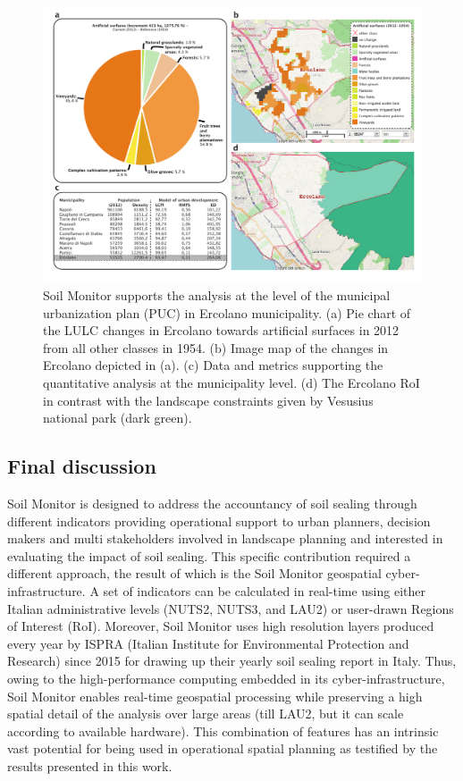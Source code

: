 \documentclass[APA,LATO1COL,doublespace]{WileyNJD-v2}
\begin{document}
\begin{figure}[t] %
    \centerline{\includegraphics[width=520pt]{07_caso_comunale}}
    \caption{ Soil Monitor supports the analysis at the level of the municipal urbanization plan (PUC) in Ercolano municipality.
              (a) Pie chart of the LULC changes in Ercolano towards artificial surfaces in 2012 from all other classes in 1954.
              (b) Image map of the changes in Ercolano depicted in (a).
              (c) Data and metrics supporting the quantitative analysis at the municipality level.
              (d) The Ercolano RoI in contrast with the landscape constraints given by Vesusius national park (dark green). }
    \label{fig:caseCOM_Ercolano}
\end{figure}

\subsection{Final discussion}
\label{sec:finaldiscussion}
Soil Monitor is designed to address the accountancy of soil sealing through different indicators providing operational support to urban planners, decision makers and multi stakeholders involved in landscape planning and interested in evaluating the impact of soil sealing. 
This specific contribution required a different approach, the result of which is the Soil Monitor geospatial cyber-infrastructure. 
A set of indicators can be calculated in real-time using either Italian administrative levels (NUTS2, NUTS3, and LAU2) or user-drawn Regions of Interest (RoI). 
Moreover, Soil Monitor uses high resolution layers produced every year by ISPRA (Italian Institute for Environmental Protection and Research) since 2015 for drawing up their yearly soil sealing report in Italy. 
Thus, owing to the high-performance computing embedded in its cyber-infrastructure, Soil Monitor enables real-time geospatial processing while preserving a high spatial detail of the analysis over large areas (till LAU2, but it can scale according to available hardware).
This combination of features has an intrinsic vast potential for being used in operational spatial planning as testified by the results presented in this work. 
\end{document}
